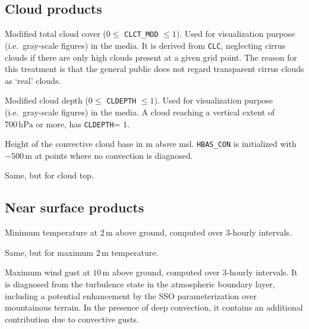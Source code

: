 \subsection{Cloud products}
\begin{description}[leftmargin=3.0cm,style=sameline]
  \item [CLCT\_MOD] Modified total cloud cover ($0 \leq$ \texttt{CLCT\_MOD} $\leq 1$). Used for visualization purpose 
                    (i.e.\ gray-scale figures) in the media. It is derived from \texttt{CLC}, neglecting cirrus clouds if 
                    there are only high clouds present at a given grid point. The reason for this treatment is that 
                    the general public does not regard transparent cirrus clouds as `real' clouds.
  \item [CLDEPTH]   Modified cloud depth ($0 \leq$ \texttt{CLDEPTH} $\leq 1$). Used for visualization purpose (i.e.\ gray-scale figures) 
                    in the media. A cloud reaching a vertical extent of $700\,\mathrm{hPa}$ or more, has \texttt{CLDEPTH}= $1$.
  \item [HBAS\_CON] Height of the convective cloud base in m above msl. \texttt{HBAS\_CON} is initialized with $-500\,\mathrm{m}$ 
                    at points where no convection is diagnosed.
  \item [HTOP\_CON] Same, but for cloud top.
\end{description}


\subsection{Near surface products}
\begin{description}[leftmargin=3.0cm,style=sameline]
  \item [TMIN\_2M]  Minimum temperature at $2\,\mathrm{m}$ above ground, computed over $3$-hourly intervals. 
  \item [TMAX\_2M]  Same, but for maximum $2\,\mathrm{m}$ temperature.
  \item [VMAX\_10M] Maximum wind gust at $10\,\mathrm{m}$ above ground, computed over $3$-hourly intervals. It is diagnosed 
                    from the turbulence state in the atmospheric boundary layer, including a potential enhancement by the 
                    SSO parameterization over mountainous terrain. In the presence of deep convection, it contains an additional 
                    contribution due to convective gusts.
\end{description}



